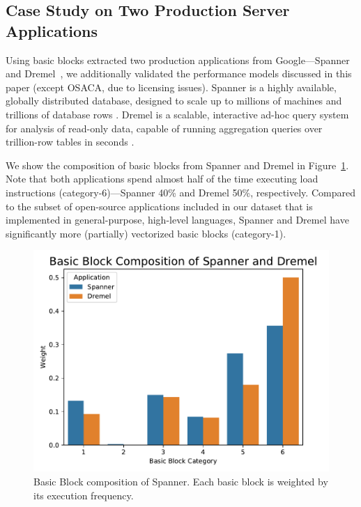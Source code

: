 \subsection{Case Study on Two Production Server Applications}
Using basic blocks extracted two production applications from Google---Spanner~\cite{spanner} and Dremel~\cite{dremel},
we additionally validated the performance models discussed in this paper 
(except OSACA, due to licensing issues).
Spanner is a highly available, globally distributed database,
designed to scale up to millions of machines and trillions of database rows \cite{spanner}.
Dremel is a scalable,
interactive ad-hoc query system for analysis of read-only data,
capable of running aggregation queries over trillion-row tables in seconds \cite{dremel}.

We show the composition of basic blocks from Spanner and Dremel in Figure~\ref{fig:google-blocks}.
Note that both applications spend almost half of the time executing load instructions (category-6)---Spanner 40\% and Dremel 50\%, respectively. Compared to the subset of open-source applications included in our dataset that is implemented in general-purpose, high-level languages,
Spanner and Dremel have significantly more (partially) vectorized basic blocks (category-1).

\begin{figure}[htbp!]
    \includegraphics[width=0.95\columnwidth]{figures/google-blocks.pdf}
    \caption{Basic Block composition of Spanner. Each basic block is weighted by its
    execution frequency.}
    \label{fig:google-blocks}
\end{figure}

